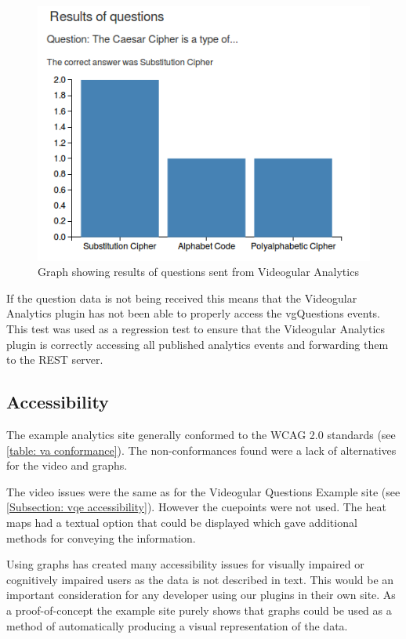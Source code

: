 \begin{figure}[h]
	\centering
		\includegraphics[scale=0.8]{../figures/analytics_graphs.png}
	\caption{\label{Figure:Analytics Question Graphs} Graph showing results of questions sent from Videogular Analytics}
\end{figure}

If the question data is not being received this means that the \gls{Videogular} Analytics plugin has not been able to properly access the \gls{vgQuestions} events. This test was used as a regression test to ensure that the Videogular Analytics plugin is correctly accessing all published analytics events and forwarding them to the \gls{REST} server.

\subsection{Accessibility}

The example analytics site generally conformed to the \gls{WCAG} 2.0 standards (see \autoref{table: va conformance}). The non-conformances found were a lack of alternatives for the video and graphs.

The video issues were the same as for the Videogular Questions Example site (see \autoref{Subsection: vqe accessibility}). However the cuepoints were not used. The heat maps had a textual option that could be displayed which gave additional methods for conveying the information.

Using graphs has created many accessibility issues for visually impaired or cognitively impaired users as the data is not described in text. This would be an important consideration for any developer using our plugins in their own site. As a proof-of-concept the example site purely shows that graphs could be used as a method of automatically producing a visual representation of the data.

